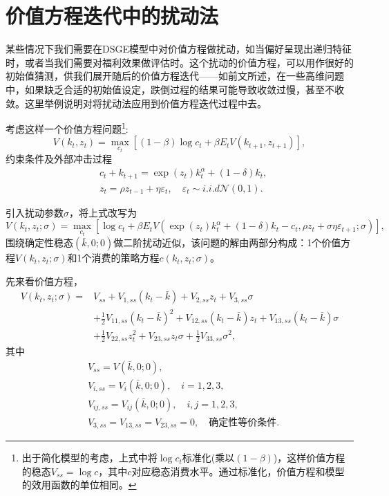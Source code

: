 \section{价值方程迭代中的扰动法}
\label{sec:pta-value-function-perturbation}
某些情况下我们需要在DSGE模型中对价值方程做扰动，如当偏好呈现出递归特征时，或者当我们需要对福利效果做评估时。这个扰动的价值方程，可以用作很好的初始值猜测，供我们展开随后的价值方程迭代——如前文所述，在一些高维问题中，如果缺乏合适的初始值设定，跌倒过程的结果可能导致收敛过慢，甚至不收敛。这里举例说明对将扰动法应用到价值方程迭代过程中去。

考虑这样一个价值方程问题\footnote{出于简化模型的考虑，上式中将$\log c_t$标准化(乘以$(1-\beta)$)，这样价值方程的稳态$V_{ss}=\log c$，其中$c$对应稳态消费水平。通过标准化，价值方程和模型的效用函数的单位相同。}:
\begin{equation*}
V(k_t,z_t) = \max_{c_t} \left[ (1-\beta) \log c_t + \beta E_t V(k_{t+1}, z_{t+1}) \right],
\end{equation*}
约束条件及外部冲击过程
\begin{equation*}
  \begin{split}
    &c_t + k_{t+1} = \exp(z_t) k_t^{\alpha} + (1-\delta) k_t, \\
    &z_t = \rho z_{t-1} + \eta \varepsilon_t, \quad \varepsilon_t \sim i.i.d \mathcal{N}(0,1).
  \end{split}
\end{equation*}

引入扰动参数$\sigma$，将上式改写为
\begin{equation*}
  V(k_t,z_t; \sigma) = \max_{c_t} \left[ \log c_t + \beta E_t V\left(\exp(z_t)k_{t}^{\alpha} + (1-\delta) k_t - c_t, \rho z_t + \sigma \eta \varepsilon_{t+1}; \sigma \right) \right],
\end{equation*}
围绕确定性稳态$(\bar{k},0;0)$做二阶扰动近似，该问题的解由两部分构成：1个价值方程$V(k_t,z_t;\sigma)$和1个消费的策略方程$c(k_t,z_t;\sigma)$。

先来看价值方程，
\begin{equation*}
  \begin{split}
    V(k_t,z_t;\sigma) =& V_{ss} + V_{1,ss}(k_t - \bar{k}) + V_{2,ss}z_t + V_{3,ss}\sigma\\
    &+\frac{1}{2}V_{11,ss}(k_t - \bar{k})^2 + V_{12,ss}(k_t - \bar{k})z_t + V_{13,ss}(k_t - \bar{k}) \sigma \\
    &+\frac{1}{2}V_{22,ss}z_t^2 + V_{23,ss}z_t \sigma + \frac{1}{2} V_{33,ss}\sigma^2,
  \end{split}
\end{equation*}
其中\begin{equation*}
\begin{split}
  &V_{ss} = V(\bar{k},0;0),\\
  &V_{i,ss} = V_{i}(\bar{k},0;0), \quad i=1,2,3,\\
  &V_{ij,ss} = V_{ij}(\bar{k},0;0), \quad i,j=1,2,3,\\
  &V_{3,ss} = V_{13,ss}=V_{23,ss} =0, \quad \text{确定性等价条件}.
\end{split}
\end{equation*}


